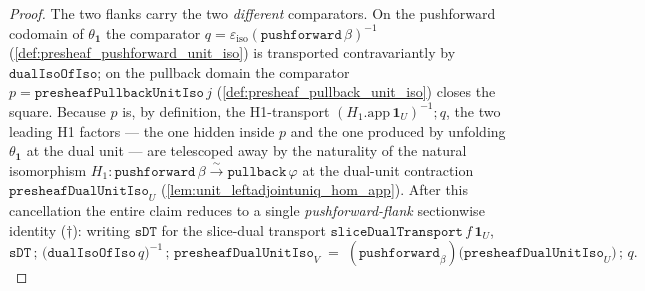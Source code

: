 \begin{proof}
  The two flanks carry the two \emph{different} comparators. On the pushforward codomain of
  \(\theta_{\mathbf 1}\) the comparator \(q = \varepsilon_{\mathrm{iso}}(\mathtt{pushforward}\,
  \beta)^{-1}\) (\cref{def:presheaf_pushforward_unit_iso}) is transported contravariantly by
  \(\mathtt{dualIsoOfIso}\); on the pullback domain the comparator
  \(p = \mathtt{presheafPullbackUnitIso}\,j\) (\cref{def:presheaf_pullback_unit_iso}) closes the
  square. Because \(p\) is, by definition, the H1-transport \((H_1.\mathrm{app}\,\mathbf 1_U)^{-1}
  \mathbin{;} q\), the two leading H1 factors --- the one hidden inside \(p\) and the one produced by
  unfolding \(\theta_{\mathbf 1}\) at the dual unit --- are telescoped away by the naturality of the
  natural isomorphism \(H_1 : \mathtt{pushforward}\,\beta \xrightarrow{\sim} \mathtt{pullback}\,
  \varphi\) at the dual-unit contraction \(\mathtt{presheafDualUnitIso}_U\)
  (\cref{lem:unit_leftadjointuniq_hom_app}). After this cancellation the entire claim reduces to a
  single \emph{pushforward-flank} sectionwise identity ($\dagger$): writing \(\mathtt{sDT}\) for the
  slice-dual transport \(\mathtt{sliceDualTransport}\,f\,\mathbf 1_U\),
  \[
    \mathtt{sDT}
      \,\mathbin{;}\, \bigl(\mathtt{dualIsoOfIso}\,q\bigr)^{-1}
      \,\mathbin{;}\, \mathtt{presheafDualUnitIso}_V
    \;=\;
    (\mathtt{pushforward}_\beta)\bigl(\mathtt{presheafDualUnitIso}_U\bigr)
      \,\mathbin{;}\, q .
  \]


\end{proof}
